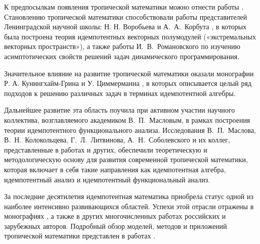 \documentclass[specialist,
               substylefile = spbu.rtx,
               subf,href,colorlinks=true, 12pt]{disser}
\theoremstyle{definition}
\begin{document}
К предпосылкам появления тропической математики можно отнести работы \cite{Kleene1956Representation, Bellman1956OnQuasiLinear}. 
Становлению тропической математики %
способствовали работы представителей Ленинградской научной школы: Н. Н. Воробьева \cite{Vorobyov1963Extremal, Vorobyov1967Extremal,Vorobyov1970Extremal} и  А.~А.~Корбута \cite{Korbut1965Extremal, Korbut1972Extremal}, в которых была построена теория идемпотентных векторных полумодулей («экстремальных векторных пространств»), а также работы И.~В.~Романовского \cite{Romanovsky1967Optimization, Romanovsky1967Asymptotic,Romanovsky1971Determinate} по изучению асимптотических свойств решений задач динамического программирования.

 
Значительное влияние на развитие тропической математики оказали монографии Р. А. Кунингхайм-Грина \cite{Cuninghame1979Minimax} и  У. Циммерманна \cite{Zimmermann1981Linear}, в которых описывается целый ряд подходов к решению различных задач в терминах идемпотентной алгебры.

Дальнейшее развитие эта область поучила при активном участии научного коллектива, возглавляемого академиком В.~П.~Масловым, в рамках построения теории идемпотентного функционального анализа. %
Исследования В.~П.~Маслова, В.~Н.~Колокольцева, Г.~Л.~Литвинова, А.~Н.~Соболевского и их коллег, представленные в работах \cite{Maslov1994Idempotent,Kolokoltsov1997Idempotent,Litvinov2001Idempotent} и других, обеспечили теоретическую и методологическую основу для развития современной тропической математики, которая включает в себя такие направления как идемпотентная алгебра, идемпотентный анализ и идемпотентный функциональный анализ.
 
За последние десятилетия идемпотентная математика приобрела статус одной из наиболее интенсивно развивающихся областей. Успехи этой отрасли отражены в монографиях \cite{Pin1998Tropical, Golan2003Semirings, Heidergott2006Max, McEneaney2006Maxplus, Krivulin2009Methods, Butkovic2010MaxLinear}, а также в других многочисленных работах российских и зарубежных авторов.  Подробный обзор моделей, методов и приложений тропической математики
представлен в работах \cite{Baccelli1992Synchronization,Maslov1994Idempotent,Golan2003Semirings,Heidergott2006Max,Krivulin2009Methods}.
\end{document}
